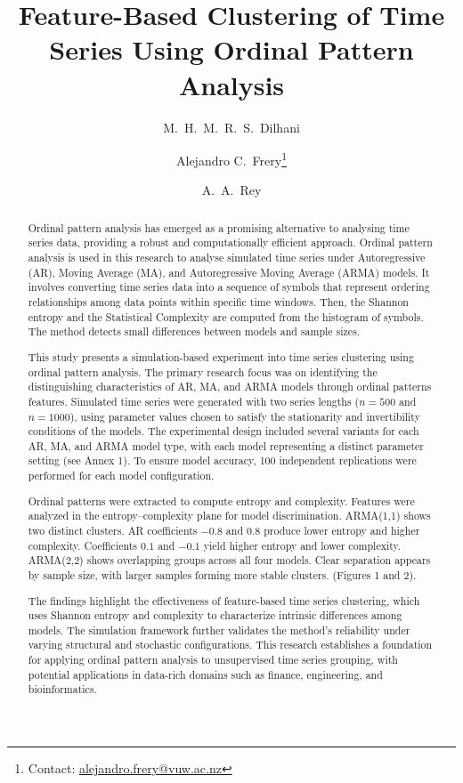 \documentclass[11pt,a4paper]{article}
\title{\vspace{-1cm}Feature-Based Clustering of Time Series Using Ordinal Pattern Analysis\vspace{-0.3cm}}
\author[1]{M.\ H.\ M.\ R.\ S.\ Dilhani}
\author[1]{Alejandro C.\ Frery\thanks{Contact: \href{mailto:alejandro.frery@vuw.ac.nz}{alejandro.frery@vuw.ac.nz}}}
\author[2]{A.\ A.\ Rey}
\affil[1]{School of Mathematics and Statistics, Victoria University of Wellington, New Zealand}
\affil[2]{Laboratorio de Investigación y Desarrollo Experimental en Computación (LIDEC),\\
	Instituto de Tecnología e Ingeniería, Universidad Nacional de Hurlingham (UNAHUR), Argentina}
\date{}
\begin{document}
	\maketitle
	\vspace{-0.5cm}
	
	\begin{abstract}
	
	
Ordinal pattern analysis has emerged as a promising alternative to analysing time series data, providing a robust and computationally efficient approach. Ordinal pattern analysis is used in this research to analyse simulated time series under Autoregressive (AR), Moving Average (MA), and Autoregressive Moving Average (ARMA) models. It involves converting time series data into a sequence of symbols that represent ordering relationships among data points within specific time windows.  Then, the Shannon entropy and the Statistical Complexity are computed from the histogram of symbols. The method detects small differences between models and sample sizes.
	
This study presents a simulation-based experiment into time series clustering using ordinal pattern analysis. The primary research focus was on identifying the distinguishing characteristics of AR, MA, and ARMA models through ordinal patterns features. Simulated time series were generated with two series lengths ($n = 500$ and $n = 1000$), using parameter values chosen to satisfy the stationarity and invertibility conditions of the models. The experimental design included several variants for each AR, MA, and ARMA model type, with each model representing a distinct parameter setting (see Annex 1). To ensure model accuracy, 100 independent replications were performed for each model configuration.

Ordinal patterns were extracted to compute entropy and complexity. Features were analyzed in the entropy–complexity plane for model discrimination. ARMA(1,1) shows two distinct clusters. AR coefficients $-0.8$ and $0.8$ produce lower entropy and higher complexity. Coefficients $0.1$ and $-0.1$ yield higher entropy and lower complexity. ARMA(2,2) shows overlapping groups across all four models. Clear separation appears by sample size, with larger samples forming more stable clusters. (Figures 1 and 2).

The findings highlight the effectiveness of feature-based time series clustering, which uses Shannon entropy and complexity to characterize intrinsic differences among models. The simulation framework further validates the method’s reliability under varying structural and stochastic configurations. This research establishes a foundation for applying ordinal pattern analysis to unsupervised time series grouping, with potential applications in data-rich domains such as finance, engineering, and bioinformatics.
	
\end{abstract}
\end{document}
